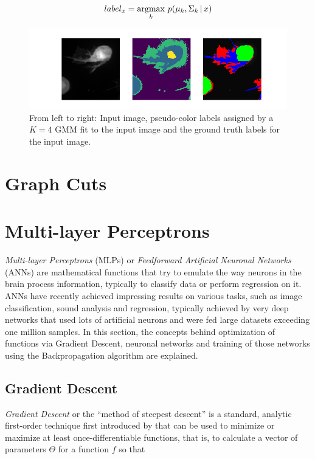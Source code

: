 \[ label_x = \operatorname*{\arg\!\max} \limits_{k} \, p(\mu_k, \Sigma_k\, | \, x) \]

\begin {figure}[!ht]
	\includegraphics{img/fig_gmm_vs_gt}
	\caption{From left to right: Input image, pseudo-color labels assigned by a $K=4$ GMM fit to the input image and the ground truth labels for the input image.}
	\label{fig:gmm_vs_gt}
\end {figure}


	\section{Graph Cuts}



	\section{Multi-layer Perceptrons}
\textit{Multi-layer Perceptrons} (MLPs) or \textit{Feedforward Artificial Neuronal Networks} (ANNs) are mathematical functions that try to emulate the way neurons in the brain process information, typically to classify data or perform regression on it. ANNs have recently achieved impressing results on various tasks, such as image classification, sound analysis and regression, typically achieved by very deep networks that used lots of artificial neurons and were fed large datasets exceeding one million samples. In this section, the concepts behind optimization of functions via Gradient Descent, neuronal networks and training of those networks using the Backpropagation algorithm are explained. 



\subsection {Gradient Descent}
\textit{Gradient Descent} or the ``method of steepest descent'' is a standard, analytic first-order technique first introduced by that can be used to minimize or maximize at least once-differentiable functions, that is, to calculate a vector of parameters $\Theta$ for a function $f$ so that

